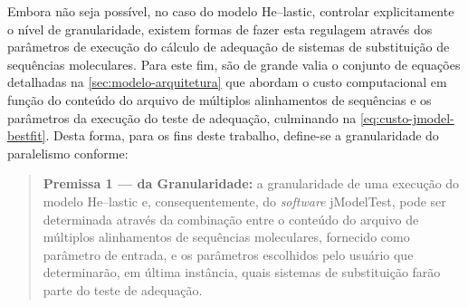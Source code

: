 \documentclass[english,brazilian]{UNISINOSmonografia} %
\begin{document}
Embora não seja possível, no caso do modelo \textsf{He}--lastic, controlar explicitamente o nível de granularidade, existem formas de fazer esta regulagem através dos parâmetros de execução do cálculo de adequação de sistemas de substituição de sequências moleculares.
Para este fim, são de grande valia o conjunto de equações detalhadas na \autoref{sec:modelo-arquitetura} que abordam o custo computacional em função do conteúdo do arquivo de múltiplos alinhamentos de sequências e os parâmetros da execução do teste de adequação, culminando na \autoref{eq:custo-jmodel-bestfit}.
Desta forma, para os fins deste trabalho, define-se a granularidade do paralelismo conforme:
\begin{quote}
	\textbf{Premissa 1 --- da Granularidade:} a granularidade de uma execução do modelo \textsf{He}--lastic e, consequentemente, do \textit{software} jModelTest, pode ser determinada através da combinação entre o conteúdo do arquivo de múltiplos alinhamentos de sequências moleculares, fornecido como parâmetro de entrada, e os parâmetros escolhidos pelo usuário que determinarão, em última instância, quais sistemas de substituição farão parte do teste de adequação.
\end{quote}
\end{document}
